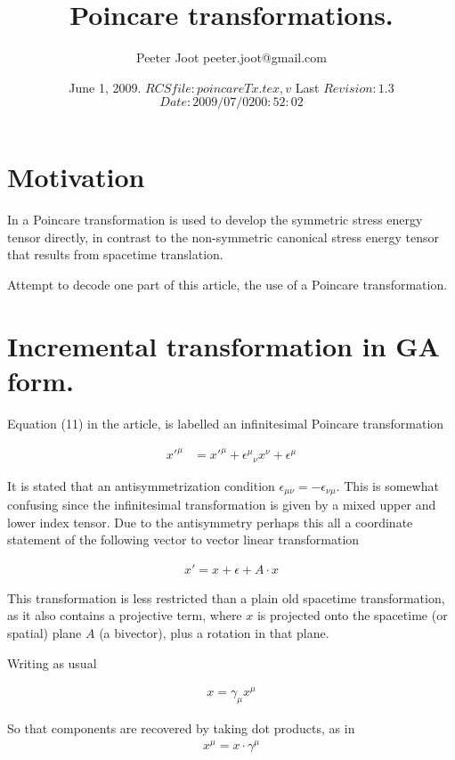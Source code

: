 \documentclass{article}
\title{Poincare transformations.}
\author{Peeter Joot \quad peeter.joot@gmail.com }
\date{ June 1, 2009.  $RCSfile: poincareTx.tex,v $ Last $Revision: 1.3 $ $Date: 2009/07/02 00:52:02 $ }
\begin{document}
\maketitle{}
\tableofcontents
\section{Motivation}

In \cite{montesinos2006sem} a Poincare transformation is used to 
develop the symmetric stress energy tensor directly, in contrast to the
non-symmetric canonical stress energy tensor that results from 
spacetime translation.

Attempt to decode one part of this article, the use of a Poincare transformation.

\section{Incremental transformation in GA form.}

Equation (11) in the article, is labelled an infinitesimal Poincare
transformation

\begin{align}\label{eqn:txComponents}
{x'}^\mu
&=
{x'}^\mu
+ {{\epsilon}^\mu}_\nu x^\nu
+ {\epsilon}^\mu
\end{align}

It is stated that an antisymmetrization condition $\epsilon_{\mu\nu} = -\epsilon_{\nu\mu}$.  This is somewhat confusing 
since the infinitesimal transformation is given by a mixed upper and lower index tensor.   Due to the antisymmetry
perhaps this all a coordinate statement of the following vector to vector linear transformation

\begin{align}\label{eqn:blah}
x' = x + \epsilon + A \cdot x
\end{align}

This transformation is less restricted than a plain old spacetime transformation, as it also contains a projective term, where $x$ is projected onto the spacetime (or spatial) plane $A$ (a bivector), plus a rotation in that plane.

Writing as usual

\begin{align*}
x = \gamma_\mu x^\mu
\end{align*}

So that components are recovered by taking dot products, as in
\begin{align*}
x^\mu = x \cdot \gamma^\mu
\end{align*}
\end{document}
